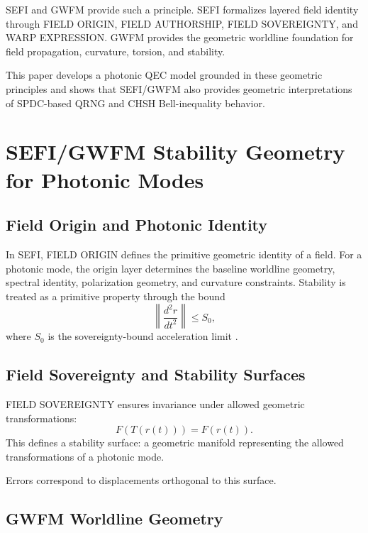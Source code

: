 \documentclass[aip, reprint, superscriptaddress]{revtex4-2}
\begin{document}
SEFI \cite{DuttonSEFI} and GWFM \cite{DuttonGWFM} provide such a principle. SEFI 
formalizes layered field identity through FIELD ORIGIN, FIELD AUTHORSHIP, FIELD 
SOVEREIGNTY, and WARP EXPRESSION. GWFM provides the geometric worldline 
foundation for field propagation, curvature, torsion, and stability.

This paper develops a photonic QEC model grounded in these geometric principles and 
shows that SEFI/GWFM also provides geometric interpretations of SPDC-based QRNG 
and CHSH Bell-inequality behavior.

\section{SEFI/GWFM Stability Geometry for Photonic Modes}

\subsection{Field Origin and Photonic Identity}

In SEFI, FIELD ORIGIN defines the primitive geometric identity of a field. For a photonic 
mode, the origin layer determines the baseline worldline geometry, spectral identity, 
polarization geometry, and curvature constraints. Stability is treated as a primitive 
property through the bound
\begin{equation}
\left\| \frac{d^2 r}{dt^2} \right\| \le S_0,
\end{equation}
where $S_0$ is the sovereignty-bound acceleration limit \cite{DuttonSEFI}.

\subsection{Field Sovereignty and Stability Surfaces}

FIELD SOVEREIGNTY ensures invariance under allowed geometric transformations:
\begin{equation}
F(T(r(t))) = F(r(t)).
\end{equation}
This defines a stability surface: a geometric manifold representing the allowed 
transformations of a photonic mode.

Errors correspond to displacements orthogonal to this surface.

\subsection{GWFM Worldline Geometry}
\end{document}
